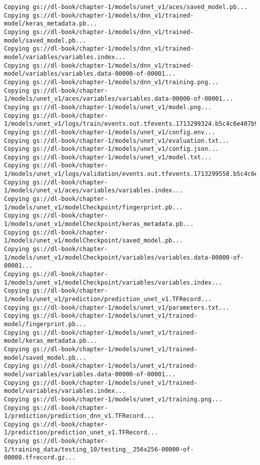 \documentclass[
  letterpaper,
  DIV=11,
  numbers=noendperiod]{scrreprt}
\begin{document}
\begin{verbatim}
Copying gs://dl-book/chapter-1/models/unet_v1/aces/saved_model.pb...
Copying gs://dl-book/chapter-1/models/dnn_v1/trained-model/keras_metadata.pb... 
Copying gs://dl-book/chapter-1/models/dnn_v1/trained-model/saved_model.pb...    
Copying gs://dl-book/chapter-1/models/dnn_v1/trained-model/variables/variables.index...
Copying gs://dl-book/chapter-1/models/dnn_v1/trained-model/variables/variables.data-00000-of-00001...
Copying gs://dl-book/chapter-1/models/dnn_v1/training.png...                    
Copying gs://dl-book/chapter-1/models/unet_v1/aces/variables/variables.data-00000-of-00001...
Copying gs://dl-book/chapter-1/models/unet_v1/model.png...                      
Copying gs://dl-book/chapter-1/models/unet_v1/logs/train/events.out.tfevents.1713299324.b5c4c6e407b9.190.0.v2...
Copying gs://dl-book/chapter-1/models/unet_v1/config.env...                     
Copying gs://dl-book/chapter-1/models/unet_v1/evaluation.txt...
Copying gs://dl-book/chapter-1/models/unet_v1/config.json...                    
Copying gs://dl-book/chapter-1/models/unet_v1/model.txt...                      
Copying gs://dl-book/chapter-1/models/unet_v1/logs/validation/events.out.tfevents.1713299558.b5c4c6e407b9.190.1.v2...
Copying gs://dl-book/chapter-1/models/unet_v1/aces/variables/variables.index... 
Copying gs://dl-book/chapter-1/models/unet_v1/modelCheckpoint/fingerprint.pb... 
Copying gs://dl-book/chapter-1/models/unet_v1/modelCheckpoint/keras_metadata.pb...
Copying gs://dl-book/chapter-1/models/unet_v1/modelCheckpoint/saved_model.pb... 
Copying gs://dl-book/chapter-1/models/unet_v1/modelCheckpoint/variables/variables.data-00000-of-00001...
Copying gs://dl-book/chapter-1/models/unet_v1/modelCheckpoint/variables/variables.index...
Copying gs://dl-book/chapter-1/models/unet_v1/prediction/prediction_unet_v1.TFRecord...
Copying gs://dl-book/chapter-1/models/unet_v1/parameters.txt...
Copying gs://dl-book/chapter-1/models/unet_v1/trained-model/fingerprint.pb...   
Copying gs://dl-book/chapter-1/models/unet_v1/trained-model/keras_metadata.pb...
Copying gs://dl-book/chapter-1/models/unet_v1/trained-model/saved_model.pb...   
Copying gs://dl-book/chapter-1/models/unet_v1/trained-model/variables/variables.data-00000-of-00001...
Copying gs://dl-book/chapter-1/models/unet_v1/trained-model/variables/variables.index...
Copying gs://dl-book/chapter-1/models/unet_v1/training.png...                   
Copying gs://dl-book/chapter-1/prediction/prediction_dnn_v1.TFRecord...         
Copying gs://dl-book/chapter-1/prediction/prediction_unet_v1.TFRecord...        
Copying gs://dl-book/chapter-1/training_data/testing_10/testing__256x256-00000-of-00008.tfrecord.gz...

\end{verbatim}
\end{document}
